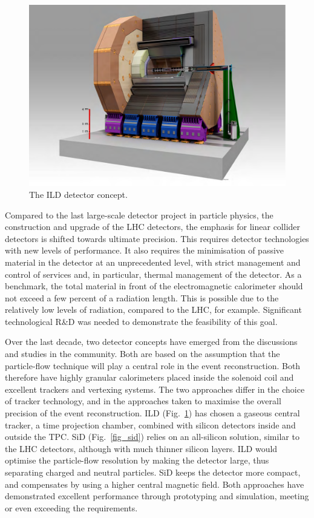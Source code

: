 \documentclass[%
 reprint,
 floatfix,
 amsmath,amssymb,
 aps,
]{revtex4-1}
\def\Fig#1{Fig.~\ref{#1}}
\begin{document}
\begin{figure}[tb]
 \begin{center}
 \includegraphics[width=0.9\hsize]{figures/ILD.pdf}
\caption{The ILD detector concept.
\label{fig_ild}}
 \end{center}
 \vspace{-0.7cm}
 \end{figure}
 
Compared to the last large-scale detector project in particle physics,
the construction and upgrade of the LHC detectors, the 
emphasis for linear collider detectors
 is shifted towards ultimate precision. This requires detector technologies
with new levels of performance.  It also requires the  minimisation of
passive material in the detector at an unprecedented level, with strict
management and control of services and, in particular,
thermal management of the detector.  As a benchmark,  the total
material in front of the electromagnetic calorimeter should not exceed
a few percent of a radiation length. 
This is possible due to the relatively low levels
of radiation, compared to the LHC, for example.
Significant technological R\&D was needed to
demonstrate the feasibility of this goal. 



Over the last decade, two detector concepts have emerged from the
discussions and studies in the community. Both are based on the assumption that
the 
particle-flow technique will  play a central role in the event
reconstruction. Both therefore have highly granular calorimeters
placed inside the solenoid coil
and excellent trackers and vertexing systems. The two approaches
differ in the choice of tracker technology, and in the approaches taken
to maximise the overall precision of the event reconstruction. ILD
(\Fig{fig_ild}) has chosen a gaseous central tracker, a time
projection chamber, combined with silicon detectors inside and outside
the TPC. SiD (\Fig{fig_sid}) relies on an all-silicon solution,
similar to the
 LHC detectors, although with
much thinner silicon layers. ILD would optimise the particle-flow
resolution by making the detector large, thus separating charged and
neutral particles. SiD keeps the detector more compact, and
compensates by using a higher central magnetic field. Both approaches
have demonstrated excellent performance through prototyping
 and simulation, meeting or even exceeding the requirements. 
\end{document}
